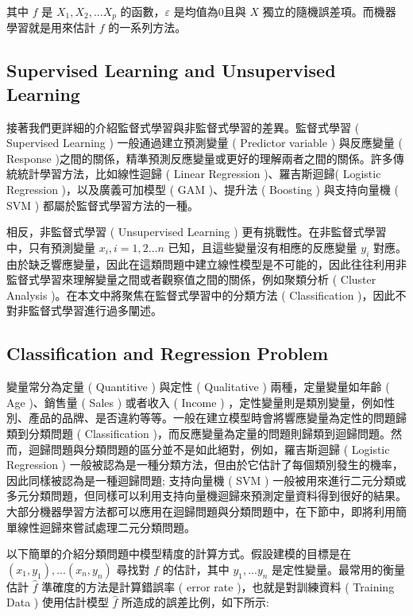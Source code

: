 其中 $f$ 是 $X_1, X_2,...X_p$ 的函數，$\varepsilon$  是均值為0且與 $X$ 獨立的隨機誤差項。而機器學習就是用來估計 $f$ 的一系列方法。

\subsection{Supervised Learning and Unsupervised Learning}

接著我們更詳細的介紹監督式學習與非監督式學習的差異。監督式學習 ( Supervised Learning ) 一般通過建立預測變量 ( Predictor variable ) 與反應變量 ( Response )之間的關係，精準預測反應變量或更好的理解兩者之間的關係。許多傳統統計學習方法，比如線性迴歸 ( Linear Regression )、羅吉斯迴歸( Logistic Regression )，以及廣義可加模型 ( GAM )、提升法 ( Boosting ) 與支持向量機 ( SVM ) 都屬於監督式學習方法的一種。

相反，非監督式學習 ( Unsupervised Learning ) 更有挑戰性。在非監督式學習中，只有預測變量 $x_i, i = 1, 2... n$ 已知，且這些變量沒有相應的反應變量 $y_i$ 對應。由於缺乏響應變量，因此在這類問題中建立線性模型是不可能的，因此往往利用非監督式學習來理解變量之間或者觀察值之間的關係，例如聚類分析 ( Cluster Analysis )。在本文中將聚焦在監督式學習中的分類方法 ( Classification )，因此不對非監督式學習進行過多闡述。

\subsection{Classification and Regression Problem}

變量常分為定量 ( Quantitive ) 與定性 ( Qualitative ) 兩種，定量變量如年齡 ( Age )、銷售量 ( Sales ) 或者收入 ( Income ) ，定性變量則是類別變量，例如性別、產品的品牌、是否違約等等。一般在建立模型時會將響應變量為定性的問題歸類到分類問題 ( Classification )，而反應變量為定量的問題則歸類到迴歸問題。然而，迴歸問題與分類問題的區分並不是如此絕對，例如，羅吉斯迴歸 ( Logistic Regression ) 一般被認為是一種分類方法，但由於它估計了每個類別發生的機率，因此同樣被認為是一種迴歸問題; 支持向量機 ( SVM ) 一般被用來進行二元分類或多元分類問題，但同樣可以利用支持向量機迴歸來預測定量資料得到很好的結果。大部分機器學習方法都可以應用在迴歸問題與分類問題中，在下節中，即將利用簡單線性迴歸來嘗試處理二元分類問題。



以下簡單的介紹分類問題中模型精度的計算方式。假設建模的目標是在 $(x_1,y_1), ...(x_n, y_n)$ 尋找對 $f$ 的估計，其中 $y_1,...y_n$ 是定性變量。最常用的衡量估計 $\hat{f}$ 準確度的方法是計算錯誤率 ( error rate )，也就是對訓練資料 ( Training Data ) 使用估計模型 $\hat{f}$ 所造成的誤差比例，如下所示:

